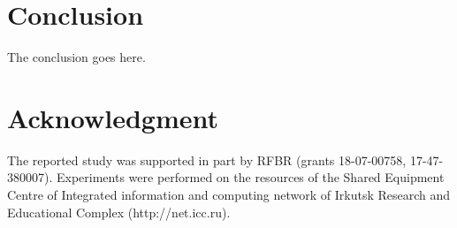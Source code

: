 \documentclass[conference,a4paper]{IEEEtran}
\begin{document}




\section{Conclusion}
The conclusion goes here.






\section*{Acknowledgment}
The reported study was supported in part by RFBR (grants 18-07-00758, 17-47-380007). Experiments were performed on the resources of the Shared Equipment Centre of Integrated information and computing network of Irkutsk Research and Educational Complex (http://net.icc.ru).






\end{document}
